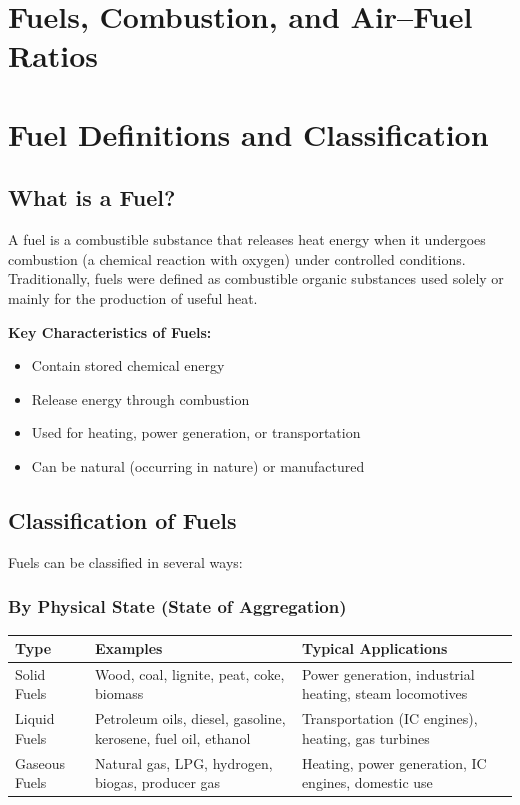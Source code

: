 \documentclass[12pt,a4paper]{article}
\begin{document}
\section*{Fuels, Combustion, and Air--Fuel Ratios}

\section{Fuel Definitions and Classification}

\subsection{What is a Fuel?}
A fuel is a combustible substance that releases heat energy when it undergoes combustion (a chemical reaction with oxygen) under controlled conditions. Traditionally, fuels were defined as combustible organic substances used solely or mainly for the production of useful heat.

\textbf{Key Characteristics of Fuels:}
\begin{itemize}
    \item Contain stored chemical energy
    \item Release energy through combustion
    \item Used for heating, power generation, or transportation
    \item Can be natural (occurring in nature) or manufactured
\end{itemize}

\subsection{Classification of Fuels}
Fuels can be classified in several ways:

\subsubsection{By Physical State (State of Aggregation)}
\begin{center}
\renewcommand{\arraystretch}{1.4}
\begin{tabular}{|l|p{5.5cm}|p{6.5cm}|}
\hline
\textbf{Type} & \textbf{Examples} & \textbf{Typical Applications} \\
\hline
Solid Fuels & Wood, coal, lignite, peat, coke, biomass & Power generation, industrial heating, steam locomotives \\
\hline
Liquid Fuels & Petroleum oils, diesel, gasoline, kerosene, fuel oil, ethanol & Transportation (IC engines), heating, gas turbines \\
\hline
Gaseous Fuels & Natural gas, LPG, hydrogen, biogas, producer gas & Heating, power generation, IC engines, domestic use \\
\hline
\end{tabular}
\end{center}
\end{document}
